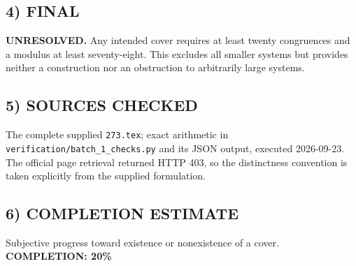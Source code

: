 \subsection*{4) FINAL}
\textbf{UNRESOLVED.} Any intended cover requires at least twenty congruences and a modulus at least seventy-eight. This excludes all smaller systems but provides neither a construction nor an obstruction to arbitrarily large systems.
\subsection*{5) SOURCES CHECKED}
The complete supplied \texttt{273.tex}; exact arithmetic in \texttt{verification/batch\_1\_checks.py} and its JSON output, executed 2026-09-23. The official page retrieval returned HTTP 403, so the distinctness convention is taken explicitly from the supplied formulation.
\subsection*{6) COMPLETION ESTIMATE}
Subjective progress toward existence or nonexistence of a cover.
\textbf{COMPLETION: 20\%}
